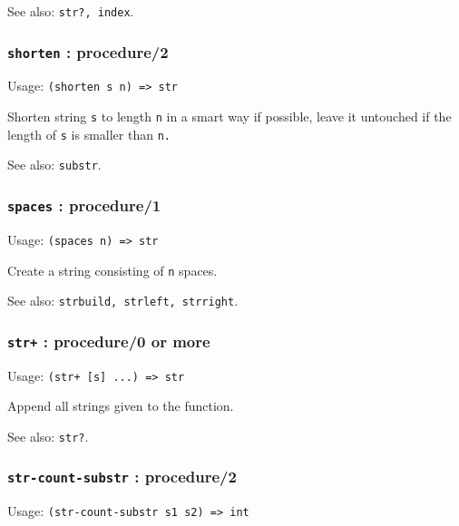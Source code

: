 \documentclass[
]{article}
\newcommand{\passthrough}[1]{#1}
\begin{document}
See also: \passthrough{\lstinline!str?, index!}.

\hypertarget{shorten-procedure2}{%
\subsubsection{\texorpdfstring{\texttt{shorten} :
procedure/2}{shorten : procedure/2}}\label{shorten-procedure2}}

Usage: \passthrough{\lstinline!(shorten s n) => str!}

Shorten string \passthrough{\lstinline!s!} to length
\passthrough{\lstinline!n!} in a smart way if possible, leave it
untouched if the length of \passthrough{\lstinline!s!} is smaller than
\passthrough{\lstinline!n.!}

See also: \passthrough{\lstinline!substr!}.

\hypertarget{spaces-procedure1}{%
\subsubsection{\texorpdfstring{\texttt{spaces} :
procedure/1}{spaces : procedure/1}}\label{spaces-procedure1}}

Usage: \passthrough{\lstinline!(spaces n) => str!}

Create a string consisting of \passthrough{\lstinline!n!} spaces.

See also: \passthrough{\lstinline!strbuild, strleft, strright!}.

\hypertarget{str-procedure0-or-more}{%
\subsubsection{\texorpdfstring{\texttt{str+} : procedure/0 or
more}{str+ : procedure/0 or more}}\label{str-procedure0-or-more}}

Usage: \passthrough{\lstinline!(str+ [s] ...) => str!}

Append all strings given to the function.

See also: \passthrough{\lstinline!str?!}.

\hypertarget{str-count-substr-procedure2}{%
\subsubsection{\texorpdfstring{\texttt{str-count-substr} :
procedure/2}{str-count-substr : procedure/2}}\label{str-count-substr-procedure2}}

Usage: \passthrough{\lstinline!(str-count-substr s1 s2) => int!}
\end{document}
